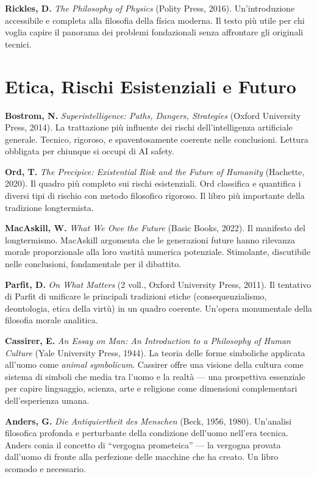 \documentclass[11.5pt,a4paper,openany]{book}
\theoremstyle{remark}
\begin{document}
\textbf{Rickles, D.} \textit{The Philosophy of Physics} (Polity Press, 2016). Un'introduzione accessibile e completa alla filosofia della física moderna. Il testo più utile per chi voglia capire il panorama dei problemi fondazionali senza affrontare gli originali tecnici.

\section{Etica, Rischi Esistenziali e Futuro}

\textbf{Bostrom, N.} \textit{Superintelligence: Paths, Dangers, Strategies} (Oxford University Press, 2014). La trattazione più influente dei rischi dell'intelligenza artificiale generale. Tecnico, rigoroso, e spaventosamente coerente nelle conclusioni. Lettura obbligata per chiunque si occupi di AI safety.

\textbf{Ord, T.} \textit{The Precipice: Existential Risk and the Future of Humanity} (Hachette, 2020). Il quadro più completo sui rischi esistenziali. Ord classifica e quantifica i diversi tipi di rischio con metodo filosofico rigoroso. Il libro più importante della tradizione longtermista.

\textbf{MacAskill, W.} \textit{What We Owe the Future} (Basic Books, 2022). Il manifesto del longtermismo. MacAskill argomenta che le generazioni future hanno rilevanza morale proporzionale alla loro vastità numerica potenziale. Stimolante, discutibile nelle conclusioni, fondamentale per il dibattito.

\textbf{Parfit, D.} \textit{On What Matters} (2 voll., Oxford University Press, 2011). Il tentativo di Parfit di unificare le principali tradizioni etiche (consequenzialismo, deontologia, etica della virtù) in un quadro coerente. Un'opera monumentale della filosofia morale analitica.

\textbf{Cassirer, E.} \textit{An Essay on Man: An Introduction to a Philosophy of Human Culture} (Yale University Press, 1944). La teoria delle forme simboliche applicata all'uomo come \textit{animal symbolicum}. Cassirer offre una visione della cultura come sistema di simboli che media tra l'uomo e la realtà — una prospettiva essenziale per capire linguaggio, scienza, arte e religione come dimensioni complementari dell'esperienza umana.

\textbf{Anders, G.} \textit{Die Antiquiertheit des Menschen} (Beck, 1956, 1980). Un'analisi filosofica profonda e perturbante della condizione dell'uomo nell'era tecnica. Anders conia il concetto di ``vergogna prometeica'' — la vergogna provata dall'uomo di fronte alla perfezione delle macchine che ha creato. Un libro scomodo e necessario.
\end{document}
